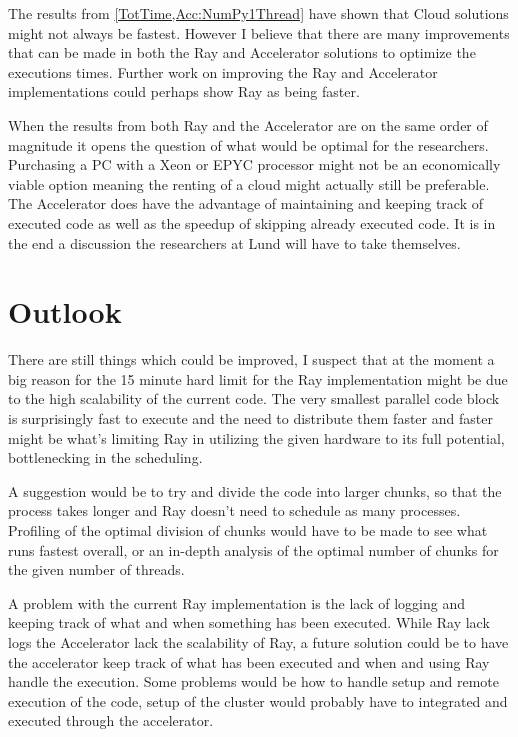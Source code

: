 \documentclass[12pt, a4paper]{article}
\begin{document}
The results from \cref{TotTime,Acc:NumPy1Thread} have shown that Cloud solutions might not always be fastest.
However I believe that there are many improvements that can be made in both the Ray and Accelerator solutions to optimize the executions times.
Further work on improving the Ray and Accelerator implementations could perhaps show Ray as being faster.

When the results from both Ray and the Accelerator are on the same order of magnitude it opens the question of what would be optimal for the researchers.
Purchasing a PC with a Xeon or EPYC processor might not be an economically viable option meaning the renting of a cloud might actually still be preferable.
The Accelerator does have the advantage of maintaining and keeping track of executed code as well as the speedup of skipping already executed code.
It is in the end a discussion the researchers at Lund will have to take themselves.


\section{Outlook}

There are still things which could be improved, I suspect that at the moment a big reason for the 15 minute hard limit for the Ray implementation might be due to the high scalability of the current code.
The very smallest parallel code block is surprisingly fast to execute and the need to distribute them faster and faster might be what's limiting Ray in utilizing the given hardware to its full potential, bottlenecking in the scheduling.

A suggestion would be to try and divide the code into larger chunks, so that the process takes longer and Ray doesn't need to schedule as many processes.
Profiling of the optimal division of chunks would have to be made to see what runs fastest overall, or an in-depth analysis of the optimal number of chunks for the given number of threads.

A problem with the current Ray implementation is the lack of logging and keeping track of what and when something has been executed.
While Ray lack logs the Accelerator lack the scalability of Ray, a future solution could be to have the accelerator keep track of what has been executed and when and using Ray handle the execution.
Some problems would be how to handle setup and remote execution of the code, setup of the cluster would probably have to integrated and executed through the accelerator.
\end{document}
